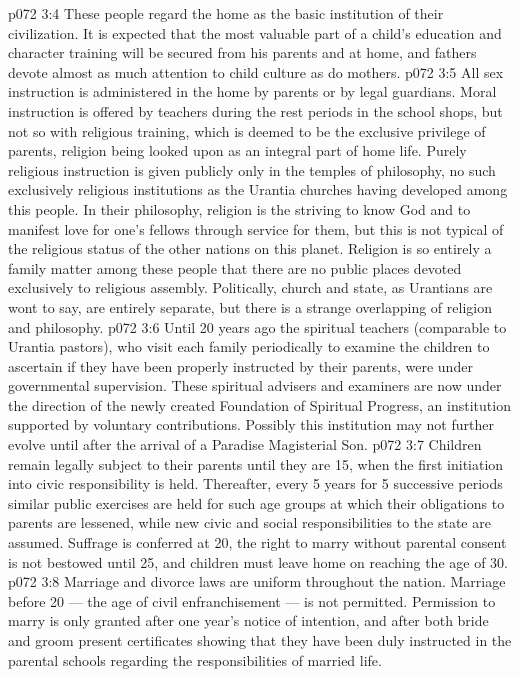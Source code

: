 \vs p072 3:4 \pc These people regard the home as the basic institution of their civilization. It is expected that the most valuable part of a child’s education and character training will be secured from his parents and at home, and fathers devote almost as much attention to child culture as do mothers.
\vs p072 3:5 All sex instruction is administered in the home by parents or by legal guardians. Moral instruction is offered by teachers during the rest periods in the school shops, but not so with religious training, which is deemed to be the exclusive privilege of parents, religion being looked upon as an integral part of home life. Purely religious instruction is given publicly only in the temples of philosophy, no such exclusively religious institutions as the Urantia churches having developed among this people. In their philosophy, religion is the striving to know God and to manifest love for one’s fellows through service for them, but this is not typical of the religious status of the other nations on this planet. Religion is so entirely a family matter among these people that there are no public places devoted exclusively to religious assembly. Politically, church and state, as Urantians are wont to say, are entirely separate, but there is a strange overlapping of religion and philosophy.
\vs p072 3:6 Until 20 years ago the spiritual teachers (comparable to Urantia pastors), who visit each family periodically to examine the children to ascertain if they have been properly instructed by their parents, were under governmental supervision. These spiritual advisers and examiners are now under the direction of the newly created Foundation of Spiritual Progress, an institution supported by voluntary contributions. Possibly this institution may not further evolve until after the arrival of a Paradise Magisterial Son.
\vs p072 3:7 \pc Children remain legally subject to their parents until they are 15, when the first initiation into civic responsibility is held. Thereafter, every 5 years for 5 successive periods similar public exercises are held for such age groups at which their obligations to parents are lessened, while new civic and social responsibilities to the state are assumed. Suffrage is conferred at 20, the right to marry without parental consent is not bestowed until 25, and children must leave home on reaching the age of 30.
\vs p072 3:8 Marriage and divorce laws are uniform throughout the nation. Marriage before 20 --- the age of civil enfranchisement --- is not permitted. Permission to marry is only granted after one year’s notice of intention, and after both bride and groom present certificates showing that they have been duly instructed in the parental schools regarding the responsibilities of married life.
